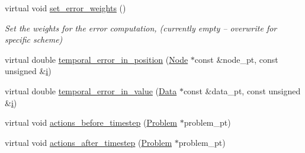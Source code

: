 \begin{DoxyCompactItemize}
virtual void \hyperlink{classoomph_1_1TimeStepper_aee0c1da870a603e64efebb51dfc96a3d}{set\+\_\+error\+\_\+weights} ()
\begin{DoxyCompactList}\small\item\em Set the weights for the error computation, (currently empty -- overwrite for specific scheme) \end{DoxyCompactList}\item 
virtual double \hyperlink{classoomph_1_1TimeStepper_ac463807aff4bcbedd6e8a463c7390536}{temporal\+\_\+error\+\_\+in\+\_\+position} (\hyperlink{classoomph_1_1Node}{Node} $\ast$const \&node\+\_\+pt, const unsigned \&\hyperlink{cfortran_8h_adb50e893b86b3e55e751a42eab3cba82}{i})
\item 
virtual double \hyperlink{classoomph_1_1TimeStepper_a27f66759f6d9b2040d26918adb998c78}{temporal\+\_\+error\+\_\+in\+\_\+value} (\hyperlink{classoomph_1_1Data}{Data} $\ast$const \&data\+\_\+pt, const unsigned \&\hyperlink{cfortran_8h_adb50e893b86b3e55e751a42eab3cba82}{i})
\item 
virtual void \hyperlink{classoomph_1_1TimeStepper_a36cbcee0c1127085ba3aa2331bfc0f74}{actions\+\_\+before\+\_\+timestep} (\hyperlink{classoomph_1_1Problem}{Problem} $\ast$problem\+\_\+pt)
\item 
virtual void \hyperlink{classoomph_1_1TimeStepper_a3a0fabf83f9bdc89800cd3501df2c586}{actions\+\_\+after\+\_\+timestep} (\hyperlink{classoomph_1_1Problem}{Problem} $\ast$problem\+\_\+pt)
\end{DoxyCompactItemize}
